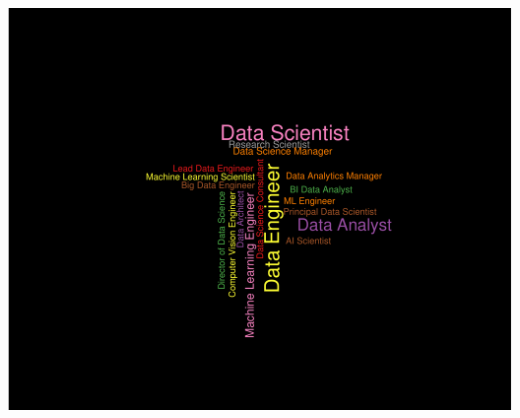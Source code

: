 \documentclass[
]{article}
\begin{document}
\includegraphics{Susman_RProject_files/figure-latex/unnamed-chunk-17-1.pdf}
\end{document}
